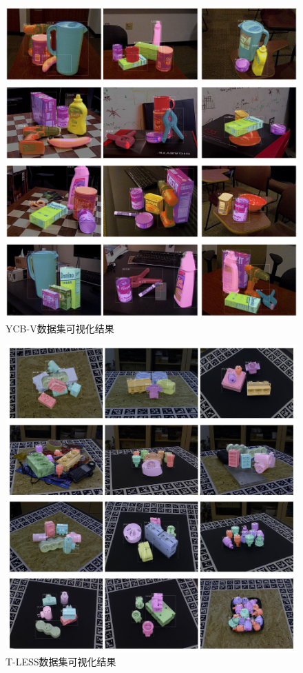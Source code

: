 \begin{figure}
    \centering
    \includegraphics[width=1\linewidth]{figure/hipose/ycbv_visulize.pdf}
    \caption{YCB-V数据集可视化结果}
    \label{fig:Qualitative_YCBV}
\end{figure}

\begin{figure}
    \centering
    \includegraphics[width=1\linewidth]{figure/hipose/tless_visulize.pdf}
    \caption{T-LESS数据集可视化结果}
    \label{fig:Qualitative_TLESS}
\end{figure}
